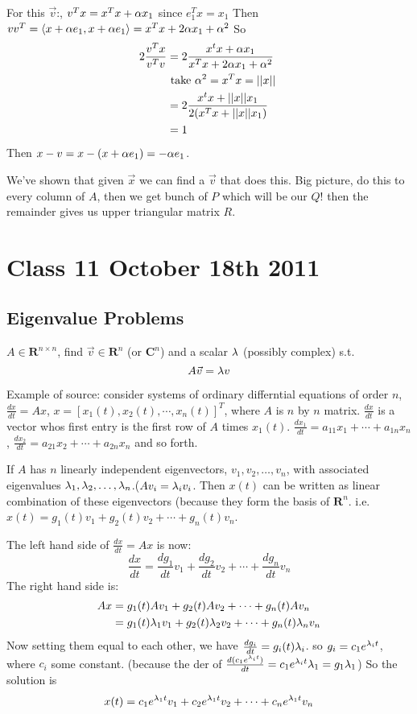 For this $\vec v$:, $v^Tx = x^Tx +\alpha x_1$ since $e_1^Tx = x_1$
Then $vv^T = \langle x+\alpha e_1, x+\alpha e_1 \rangle = x^Tx + 2\alpha x_1 + \alpha^2$
So 
\begin{align*}
2\frac{v^Tx}{v^Tv} &= 2\frac{x^tx+\alpha x_1}{x^Tx + 2\alpha x_1 + \alpha^2}\\
&\text{ take $\alpha^2=x^Tx = ||x||$ }\\
&=2\frac{x^tx+||x|| x_1}{2(x^Tx + ||x||x_1)}\\
&=1
\end{align*}
Then $x-v = x - (x+\alpha e_1) = -\alpha e_1$.

We've shown that given $\vec x$ we can find a $\vec v$ that does this.
Big picture, do this to every column of $A$, then we get bunch of $P$
which will be our $Q$! then the remainder gives us upper triangular
matrix $R$. 

\pagebreak

\section{Class 11 October 18th 2011}
\label{sec:class11}

\subsection{Eigenvalue Problems}
\label{sec:eigenvalue}

$A\in \mathbf{R}^{n\times n}$, find $\vec v\in \mathbf{R}^n$ (or
$\mathbf{C}^n$) and a scalar $\lambda$ (possibly complex) s.t. $$A\vec v =
\lambda v$$

Example of source: consider systems of ordinary differntial equations
of order $n$, $\frac{dx}{dt} = Ax$, $x = [x_1(t), x_2(t), \cdots,
x_n(t)]^T$, where $A$ is $n$ by $n$ matrix. $\frac{dx}{dt}$ is a
vector whos first entry is the first row of $A$ times
$x_1(t)$. $\frac{dx_1}{dt} = a_{11}x_1 + \cdots + a_{1n}x_n$,
$\frac{dx_2}{dt} = a_{21}x_2 + \cdots + a_{2n}x_n$ and so forth.

If $A$ has $n$ linearly independent eigenvectors, $v_1, v_2, \dots,
v_n$, with associated eigenvalues $\lambda_1, \lambda_2, \dots,
\lambda_n$.($Av_i = \lambda_iv_i$. Then $x(t)$ can be written as linear combination of these
eigenvectors (because they form the basis of
$\mathbf{R}^n$. i.e. $x(t) = g_1(t)v_1 + g_2(t)v_2 + \cdots+
g_n(t)v_n$.

The left hand side of $\frac{dx}{dt} = Ax$ is now:
$$\frac{dx}{dt} = \frac{dg_1}{dt}v_1 + \frac{dg_2}{dt}v_2 + \cdots +
\frac{dg_n}{dt}v_n$$
The right hand side is:
\begin{align*}
Ax&=g_1(t)Av_1 + g_2(t)Av_2 + \cdots + g_n(t)Av_n\\
&= g_1(t)\lambda_1v_1 + g_2(t)\lambda_2v_2 + \cdots + g_n(t)\lambda_nv_n
\end{align*}
Now setting them equal to each other,
we have $\frac{dg_i}{dt}=g_i(t)\lambda_i$.
so $g_i = c_1e^{\lambda_it}$, where $c_i$ some constant. (because the der
of $\frac{d(c_1e^{\lambda_it})}{dt} = c_1e^{\lambda_it}\lambda_1 = g_1\lambda_1$)
So the solution is $$x(t) = c_1e^{\lambda_1t}v_1+ c_2e^{\lambda_1t}v_2
+\cdots + c_ne^{\lambda_1t}v_n$$

